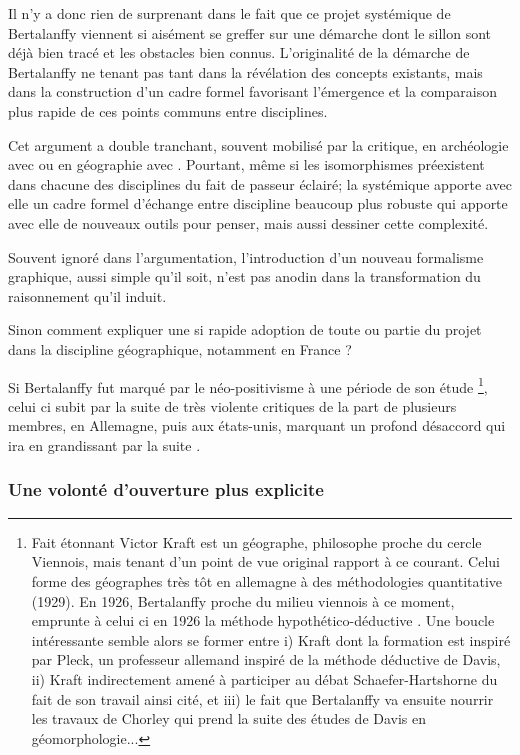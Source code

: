 Il n'y a donc rien de surprenant dans le fait que ce projet systémique de Bertalanffy viennent si aisément se greffer sur une démarche dont le sillon sont déjà bien tracé et les obstacles bien connus. L'originalité de la démarche de Bertalanffy ne tenant pas tant dans la révélation des concepts existants, mais dans la construction d'un cadre formel favorisant l'émergence et la comparaison plus rapide de ces points communs entre disciplines. 

Cet argument a double tranchant, souvent mobilisé par la critique, en archéologie avec \textcite{Salmon1978} ou en géographie avec \textcite{Chisholm1967}. Pourtant, même si les isomorphismes préexistent dans chacune des disciplines du fait de passeur éclairé; la systémique apporte avec elle un cadre formel d'échange entre discipline beaucoup plus robuste qui apporte avec elle de nouveaux outils pour penser, mais aussi dessiner cette complexité. 

Souvent ignoré dans l'argumentation, l'introduction d'un nouveau formalisme graphique, aussi simple qu'il soit, n'est pas anodin dans la transformation du raisonnement qu'il induit.

Sinon comment expliquer une si rapide adoption de toute ou partie du projet dans la discipline géographique, notamment en France ? 



Si Bertalanffy fut marqué par le néo-positivisme à une période de son étude \footnote{Fait étonnant Victor Kraft est un géographe, philosophe proche du cercle Viennois, mais tenant d'un point de vue original rapport à ce courant. Celui forme des géographes très tôt en allemagne à des méthodologies quantitative (1929). En 1926, Bertalanffy proche du milieu viennois à ce moment, emprunte à celui ci en 1926 la méthode hypothético-déductive \autocite[342]{Pouvreau2013}. Une boucle intéressante semble alors se former entre i) Kraft dont la formation est inspiré par Pleck, un professeur allemand inspiré de la méthode déductive de Davis, ii) Kraft indirectement amené à participer au débat Schaefer-Hartshorne du fait de son travail ainsi cité, et iii) le fait que Bertalanffy va ensuite nourrir les travaux de Chorley qui prend la suite des études de Davis en géomorphologie...}, celui ci subit par la suite de très violente critiques de la part de plusieurs membres, en Allemagne, puis aux états-unis, marquant un profond désaccord qui ira en grandissant par la suite \autocite[26-27]{Pouvreau2006}.

\subsubsection{Une volonté d'ouverture plus explicite}

